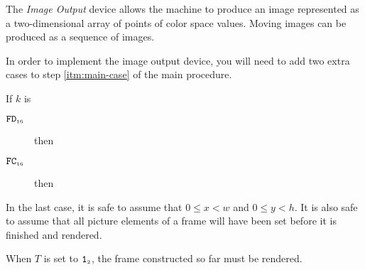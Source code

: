 \documentclass[a4paper,12pt]{article}
\newcommand{\num}[1]{\texttt{#1}}
\newcommand{\hex}[1]{\num{#1}_{\textup{\tiny 16}}}
\newcommand{\bin}[1]{\num{#1}_{\textup{\tiny 2}}}
\newcommand{\TERM}{T}
\newcommand{\T}{\bin{1}}
\newcommand{\proc}[1]{\textsc{#1}}
\newcommand{\deviceio}[1]{$\langle$#1$\rangle$}
\newcommand{\op}[1]{$#1$}
\theoremstyle{definition}
\newcommand{\SETPIXEL}  [1]{\op{\hex{FC}}}
\newcommand{\NEWFRAME}  [1]{\op{\hex{FD}}}
\begin{document}
The \emph{Image Output} device allows the machine to produce an image represented as a two-dimensional array of points of color space values.
Moving images can be produced as a sequence of images.

In order to implement the image output device, you will need to add two extra cases to step \ref{itm:main-case} of the main procedure.

\begin{stepnumbers}[start=3]
\item If $k$ is
  \begin{description}
  \item[\NEWFRAME{}] then
  \item[\SETPIXEL{}] then
  \end{description}
\end{stepnumbers}
In the last case, it is safe to assume that $0 \le x < w$ and $0 \le y < h$.
It is also safe to assume that all picture elements of a frame will have been set before it is finished and rendered.

When $\TERM{}$ is set to $\T$, the frame constructed so far must be rendered.
\end{document}
